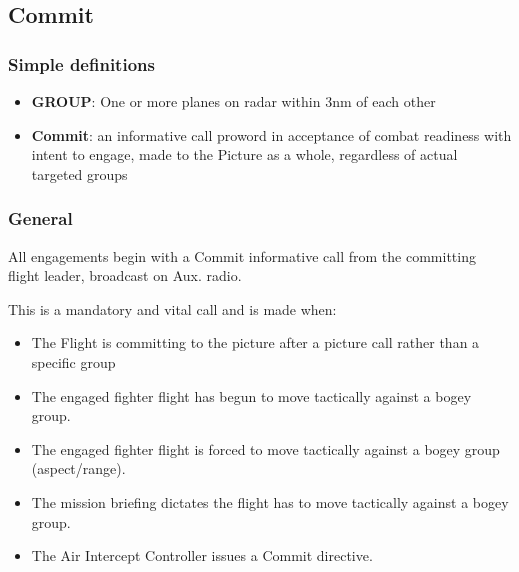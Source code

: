 \subsection{Commit}

\subsubsection*{Simple definitions}

\begin{itemize}

  \item \textbf{GROUP}: One or more planes on radar within 3nm of each other

  \item \textbf{Commit}: an informative call proword in acceptance of combat
    readiness with intent to engage, made to the Picture as a whole, regardless
    of actual targeted groups

\end{itemize}

\subsubsection*{General}

All engagements begin with a Commit informative call from the committing flight
leader, broadcast on Aux. radio.

This is a mandatory and vital call and is made when:

\begin{itemize}

  \item The Flight is committing to the picture after a picture call rather
    than a specific group

  \item The engaged fighter flight has begun to move tactically against a bogey
    group.

  \item The engaged fighter flight is forced to move tactically against a bogey
    group (aspect/range).

  \item The mission briefing dictates the flight has to move tactically against
    a bogey group.

  \item The Air Intercept Controller issues a Commit directive.

\end{itemize}

